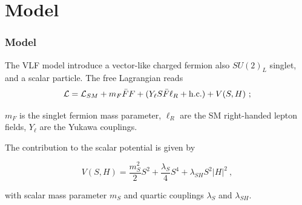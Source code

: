 \documentclass{beamer}
\begin{document}

	



\section{Model}
\begin{frame}
\frametitle{Model}
 The VLF model introduce a vector-like charged fermion also $SU(2)_L$ singlet, and a scalar particle. The free Lagrangian reads
 \begin{equation}\nonumber
 \mathcal{L} = \mathcal{L}_{SM} +  m_F \bar{F}F + ( Y_\ell S \bar{F}\ell_R + {\rm h.c.} ) + V(S,H)~;
 \end{equation}\label{EQ}
 
 $m_F$ is the singlet fermion mass parameter, $\ell_R$ are the SM right-handed lepton fields, $Y_\ell$ 
 are the Yukawa couplings. 
 
 The contribution to the scalar potential is given by
 
 \begin{equation}\nonumber
 V(S,H) = \frac{m_S^2}{2} S^2 + \frac{\lambda_S}{4} S^4 + \lambda_{SH} S^2|H|^2 ~,
 \end{equation}
 
 with scalar mass parameter $m_S$ and quartic couplings $\lambda_{S}$ and $\lambda_{SH}$.
 


\end{frame}
\end{document}
